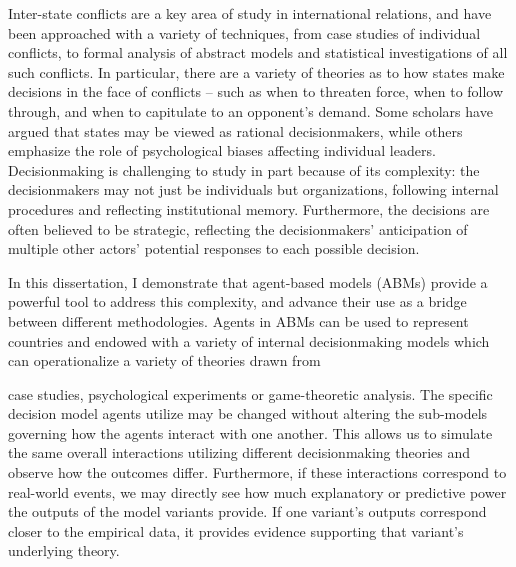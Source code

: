 \documentclass[11 pt]{report}
\begin{document}
\abstractpage

Inter-state conflicts are a key area of study in international relations, and have been approached with a variety of techniques, from case studies of individual conflicts, to formal analysis of abstract models and statistical investigations of all such conflicts. In particular, there are a variety of theories as to how states make decisions in the face of conflicts -- such as when to threaten force, when to follow through, and when to capitulate to an opponent's demand. Some scholars have argued that states may be viewed as rational decisionmakers, while others emphasize the role of psychological biases affecting individual leaders. Decisionmaking is challenging to study in part because of its complexity: the decisionmakers may not just be individuals but organizations, following internal procedures and reflecting institutional memory. Furthermore, the decisions are often believed to be strategic, reflecting the decisionmakers' anticipation of multiple other actors' potential responses to each possible decision.

In this dissertation, I demonstrate that agent-based models (ABMs) provide a powerful tool to address this complexity, and advance their use as a bridge between different methodologies. Agents in ABMs can be used to represent countries and endowed with a variety of internal decisionmaking models which can operationalize a variety of theories drawn from

\abstractmultiplepage
\noindent case studies, psychological experiments or game-theoretic analysis. The specific decision model agents utilize may be changed without altering the sub-models governing how the agents interact with one another. This allows us to simulate the same overall interactions utilizing different decisionmaking theories and observe how the outcomes differ. Furthermore, if these interactions correspond to real-world events, we may directly see how much explanatory or predictive power the outputs of the model variants provide. If one variant's outputs correspond closer to the empirical data, it provides evidence supporting that variant's underlying theory.
\end{document}
